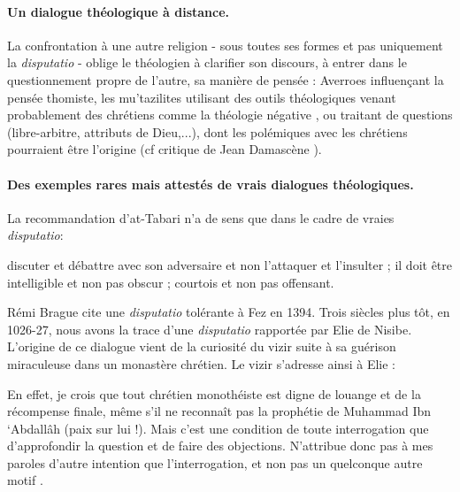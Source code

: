 \paragraph{Un dialogue théologique à distance.} 
La confrontation à une autre religion - sous toutes ses formes et pas uniquement la \textit{disputatio} - oblige le théologien à clarifier  son discours, à entrer dans le questionnement propre de l'autre, sa manière de pensée : Averroes influençant la pensée thomiste, les mu'tazilites utilisant des outils théologiques venant probablement des chrétiens comme la théologie négative \cite{Candiard_theologie_2022}, ou traitant de questions (libre-arbitre,  attributs de Dieu,...), dont les polémiques avec les chrétiens pourraient être l'origine (cf critique de Jean Damascène \cite[p.216]{damascene_ecrits_1992}). 
\begin{comment}
L'\textit{ examen des religions} d'Ibn Kammuna \cite{ibn_kammuna_examen_2012} montre la proximité des outils théologiques utilisés pour défendre chaque religion.
Enfin, le lecteur moderne de  est frappé par sa distance culturelle avec ce texte, m.
\begin{singlequote}
   Nous leur répondons : ”Puisque vous dites que le Christ est le
Verbe et l’Esprit de Dieu, comment nous reprochez-vous d’être des \textit{associateurs}
? En effet, le Verbe et l’Esprit sont chacun inséparable de celui dont il
tire son origine ; si donc le Verbe est en Dieu, il est évident qu’il est aussi
Dieu. Si, au contraire, il est en dehors de Dieu, alors Dieu, selon vous, \textit{n’a ni
verbe ni esprit}. Ainsi, en voulant éviter de donner à Dieu des associés, vous
le mutilez.
\end{singlequote}
\end{comment}
\paragraph{Des exemples rares mais attestés de vrais dialogues théologiques.}
La recommandation d'at-Tabari n'a de sens que dans le cadre de vraies \textit{disputatio}:
\begin{singlequote}
    {discuter et débattre avec son adversaire et non l’attaquer et l’insulter ; il doit être intelligible et non pas obscur ; courtois et non pas offensant.\cite[p. 34-36]{tabari_refutation_1979}}
\end{singlequote}
Rémi Brague cite une \textit{disputatio} tolérante à Fez en 1394. Trois siècles plus tôt, en 1026-27, nous avons la trace d'une \textit{disputatio} rapportée par Elie de Nisibe. L'origine de ce dialogue vient de la curiosité du vizir suite à sa guérison miraculeuse dans un monastère chrétien. Le vizir s'adresse ainsi à Elie : 
\begin{singlequote}
    En effet, je crois que tout chrétien monothéiste est digne de louange et de la récompense finale, même s’il ne reconnaît pas la prophétie de Muhammad Ibn ‘Abdallâh (paix sur lui !). Mais c’est une condition de toute interrogation que d’approfondir la question et de faire des objections. N’attribue donc pas à mes paroles d’autre intention que l’interrogation, et non pas un quelconque autre motif \cite{ElieNisibe}.
\end{singlequote}

